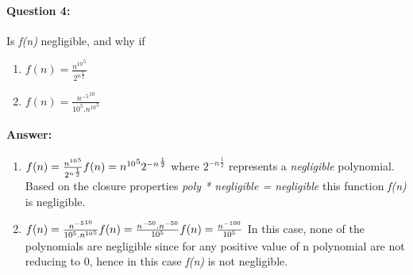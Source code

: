 \documentclass{article}
\begin{document}
    \paragraph{Question 4:} Is \emph{f(n)} negligible, and why if 
        \begin{enumerate}
            \item 
                \begin{math}
                    f(n) = \frac{{n^{10}}^5}{{2^n}^\frac{1}{2}}
                \end{math}
            \item
                \begin{math}
                    f(n) = \frac{{n^{-5}}^{10}}{{10^5}.{{n^{10}}^5}}
                \end{math}
        \end{enumerate}
        
    \paragraph{Answer: \newline}
        \begin{enumerate}
            \item 
                \begin{math}
                    f(n) = \frac{{n^{10}}^5}{{2^n}^\frac{1}{2}}\\
                    f(n) = {{n^{10}}^5}{{2^{-n}}^{\frac{1}{2}}}\\                    
                \end{math}
                where ${{2^{-n}}^{\frac{1}{2}}}$ represents a \emph{negligible} polynomial.
                Based on the closure properties \emph{poly * negligible = negligible} this function \emph{f(n)} is negligible.
            \item 
                \begin{math}
                    f(n) = \frac{{n^{-5}}^{10}}{{10^5}.{{n^{10}}^5}}\\
                    f(n) = \frac{{n^{-50}}.{n^{-50}}}{{10^5}}\\
                    f(n) = \frac{{n^{-100}}}{{10^5}}\\
                \end{math}
                In this case, none of the polynomials are negligible since for any positive value of n polynomial are not reducing to 0, hence in this case \emph{f(n)} is not negligible.
        \end{enumerate}
    
\end{document}
